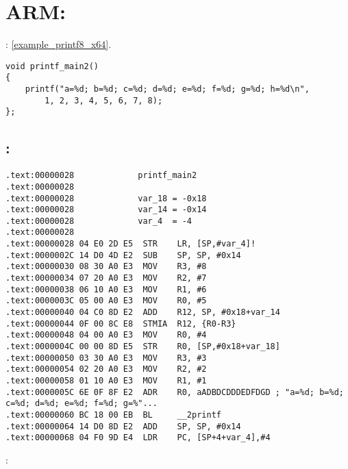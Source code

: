 \section{ARM: }

: \ref{example_printf8_x64}.

\begin{lstlisting}
void printf_main2()
{
    printf("a=%d; b=%d; c=%d; d=%d; e=%d; f=%d; g=%d; h=%d\n", 
        1, 2, 3, 4, 5, 6, 7, 8);
};
\end{lstlisting}

\subsection{\OptimizingKeilVI: \ARMMode}

\begin{lstlisting}
.text:00000028             printf_main2
.text:00000028
.text:00000028             var_18 = -0x18
.text:00000028             var_14 = -0x14
.text:00000028             var_4  = -4
.text:00000028
.text:00000028 04 E0 2D E5  STR    LR, [SP,#var_4]!
.text:0000002C 14 D0 4D E2  SUB    SP, SP, #0x14
.text:00000030 08 30 A0 E3  MOV    R3, #8
.text:00000034 07 20 A0 E3  MOV    R2, #7
.text:00000038 06 10 A0 E3  MOV    R1, #6
.text:0000003C 05 00 A0 E3  MOV    R0, #5
.text:00000040 04 C0 8D E2  ADD    R12, SP, #0x18+var_14
.text:00000044 0F 00 8C E8  STMIA  R12, {R0-R3}
.text:00000048 04 00 A0 E3  MOV    R0, #4
.text:0000004C 00 00 8D E5  STR    R0, [SP,#0x18+var_18]
.text:00000050 03 30 A0 E3  MOV    R3, #3
.text:00000054 02 20 A0 E3  MOV    R2, #2
.text:00000058 01 10 A0 E3  MOV    R1, #1
.text:0000005C 6E 0F 8F E2  ADR    R0, aADBDCDDDEDFDGD ; "a=%d; b=%d; c=%d; d=%d; e=%d; f=%d; g=%"...
.text:00000060 BC 18 00 EB  BL     __2printf
.text:00000064 14 D0 8D E2  ADD    SP, SP, #0x14
.text:00000068 04 F0 9D E4  LDR    PC, [SP+4+var_4],#4
\end{lstlisting}

:

